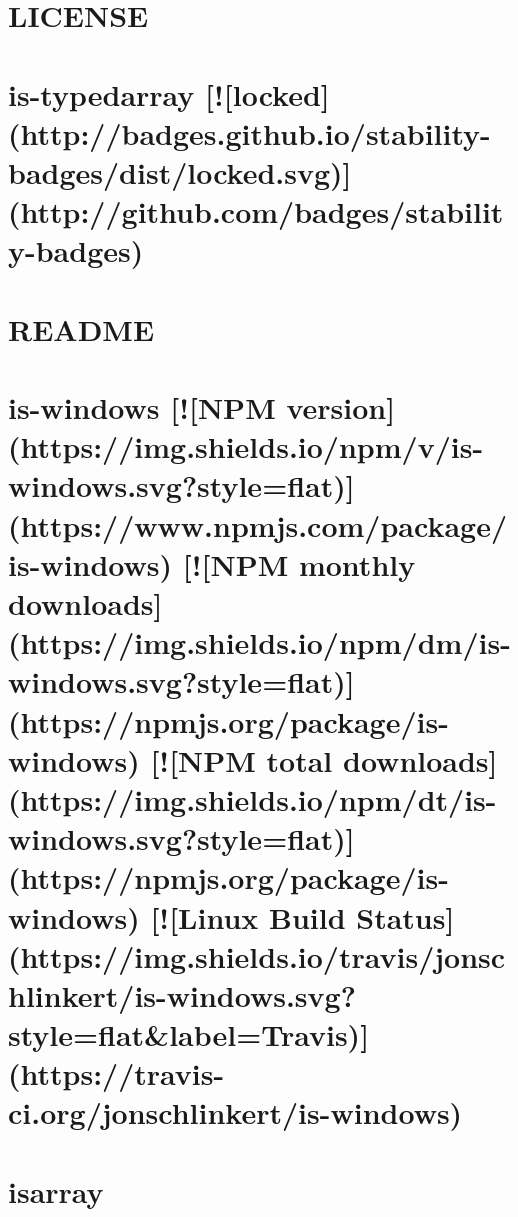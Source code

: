 \documentclass[twoside]{book}
\newcommand{\+}{\discretionary{\mbox{\scriptsize$\hookleftarrow$}}{}{}}
\begin{document}
\chapter{L\+I\+C\+E\+N\+SE}
\label{md_dsmacc_vis_degree_node_modules_is-typedarray_LICENSE}

\chapter{is-\/typedarray \mbox{[}!\mbox{[}locked\mbox{]}(http\+://badges.github.\+io/stability-\/badges/dist/locked.svg)\mbox{]}(http\+://github.com/badges/stability-\/badges)}
\label{md_dsmacc_vis_degree_node_modules_is-typedarray_README}

\chapter{R\+E\+A\+D\+ME}
\label{md_dsmacc_vis_degree_node_modules_is-utf8_README}

\chapter{is-\/windows \mbox{[}!\mbox{[}N\+PM version\mbox{]}(https\+://img.shields.\+io/npm/v/is-\/windows.svg?style=flat)\mbox{]}(https\+://www.npmjs.\+com/package/is-\/windows) \mbox{[}!\mbox{[}N\+PM monthly downloads\mbox{]}(https\+://img.shields.\+io/npm/dm/is-\/windows.svg?style=flat)\mbox{]}(https\+://npmjs.org/package/is-\/windows) \mbox{[}!\mbox{[}N\+PM total downloads\mbox{]}(https\+://img.shields.\+io/npm/dt/is-\/windows.svg?style=flat)\mbox{]}(https\+://npmjs.org/package/is-\/windows) \mbox{[}!\mbox{[}Linux Build Status\mbox{]}(https\+://img.shields.\+io/travis/jonschlinkert/is-\/windows.svg?style=flat\&label=Travis)\mbox{]}(https\+://travis-\/ci.org/jonschlinkert/is-\/windows)}
\label{md_dsmacc_vis_degree_node_modules_is-windows_README}

\chapter{isarray}
\label{md_dsmacc_vis_degree_node_modules_isarray_README}

\end{document}
